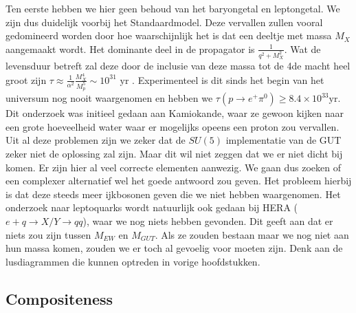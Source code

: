 \documentclass[../main.tex]{subfiles}
\begin{document}
Ten eerste hebben we hier geen behoud van het baryongetal en leptongetal. We zijn dus duidelijk voorbij het Standaardmodel. Deze vervallen zullen vooral gedomineerd worden door hoe waarschijnlijk het is dat een deeltje met massa $M_X$ aangemaakt wordt. Het dominante deel in de propagator is $\frac{1}{q^{2}+M_{X}^{2}}$. Wat de levensduur betreft zal deze door de inclusie van deze massa tot de 4de macht heel groot zijn $\tau \approx \frac{1}{\alpha^{2}} \frac{M_{X}^{4}}{M_{p}^{5}} \sim 10^{31} \text { yr }$. Experimenteel is dit sinds het begin van het universum nog nooit waargenomen en hebben we $\tau\left(p \rightarrow e^{+} \pi^{0}\right) \geq 8.4 \times 10^{33} \text{yr}$. Dit onderzoek was initieel gedaan aan Kamiokande, waar ze gewoon kijken naar een grote hoeveelheid water waar er mogelijks opeens een proton zou vervallen.\\
Uit al deze problemen zijn we zeker dat de $SU(5)$ implementatie van de GUT zeker niet de oplossing zal zijn. Maar dit wil niet zeggen dat we er niet dicht bij komen. Er zijn hier al veel correcte elementen aanwezig. We gaan dus zoeken of een complexer alternatief wel het goede antwoord zou geven. Het probleem hierbij is dat deze steeds meer ijkbosonen geven die we niet hebben waargenomen. Het onderzoek naar leptoquarks wordt natuurlijk ook gedaan bij HERA ($e+q \rightarrow X / Y \rightarrow q q$), waar we nog niets hebben gevonden. Dit geeft aan dat er niets zou zijn tussen $M_{EW}$ en $M_{GUT}$. Als ze zouden bestaan maar we nog niet aan hun massa komen, zouden we er toch al gevoelig voor moeten zijn. Denk aan de lusdiagrammen die kunnen optreden in vorige hoofdstukken.

\subsection{Compositeness}%
\label{sub:compositen}
\end{document}
